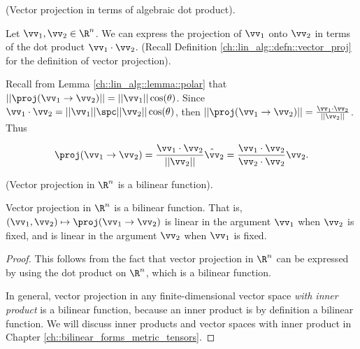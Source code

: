 \begin{theorem}
\label{ch::lin_alg::thm::vector_proj_dot_product}
    (Vector projection in terms of algebraic dot product).
    
    Let $\vv_1, \vv_2 \in \R^n$. We can express the projection of $\vv_1$ onto $\vv_2$ in terms of the dot product $\vv_1 \cdot \vv_2$. (Recall Definition \ref{ch::lin_alg::defn::vector_proj} for the definition of vector projection).
    
    Recall from Lemma \ref{ch::lin_alg::lemma::polar} that $||\proj(\vv_1 \rightarrow \vv_2)|| = ||\vv_1|| \cos(\theta)$. Since $\vv_1 \cdot \vv_2 = ||\vv_1|| \spc ||\vv_2|| \cos(\theta)$, then $||\proj(\vv_1 \rightarrow \vv_2)|| = \frac{\vv_1 \cdot \vv_2}{||\vv_2||}$. Thus
    
    \begin{align*}
        \proj(\vv_1 \rightarrow \vv_2) = \frac{\vv_1 \cdot \vv_2}{||\vv_2||} \hat{\vv}_2 = \frac{\vv_1 \cdot \vv_2}{\vv_2 \cdot \vv_2} \vv_2.
    \end{align*}
\end{theorem}

\begin{theorem}
\label{ch::lin_alg::thm::vector_proj_bilinear}
    (Vector projection in $\R^n$ is a bilinear function).
    
    Vector projection in $\R^n$ is a bilinear function. That is, $(\vv_1, \vv_2) \mapsto \proj(\vv_1 \rightarrow \vv_2)$ is linear in the argument $\vv_1$ when $\vv_2$ is fixed, and is linear in the argument $\vv_2$ when $\vv_1$ is fixed.
\end{theorem}

\begin{proof}
   This follows from the fact that vector projection in $\R^n$ can be expressed by using the dot product on $\R^n$, which is a bilinear function.
   
   In general, vector projection in any finite-dimensional vector space \textit{with inner product} is a bilinear function, because an inner product is by definition a bilinear function. We will discuss inner products and vector spaces with inner product in Chapter \ref{ch::bilinear_forms_metric_tensors}.
\end{proof}